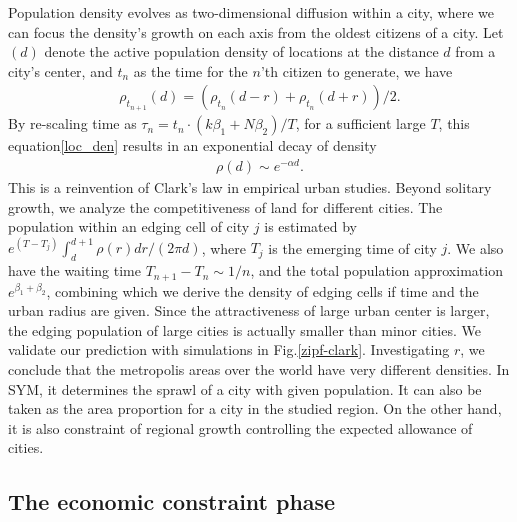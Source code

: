 \documentclass[reprint,unsortedaddress,amsmath,amssymb,aps,prl,showkeys]{revtex4-2}
\begin{document}

Population density evolves as two-dimensional diffusion within a city\cite{doi:10.1137/0150099}, where we can focus the density's growth on each axis from the oldest citizens of a city. Let $
(d)$ denote the active population density of locations at the distance $d$ from a city's center, and $t_n$ as the time for the $n$'th citizen to generate, we have 
\begin{align}
	\rho_{t_{n+1}}(d) = (\rho_{t_{n}}(d-r) + \rho_{t_{n}}(d+r) )/2.\label{loc_den}  
\end{align} By re-scaling time as $\tau_n = t_n\cdot (k\beta_1+N\beta_2)/T$, for a sufficient large $T$, this equation\@\ref{loc_den} results in an exponential decay of density
\begin{align}
	\rho(d)\sim e^{-\alpha d}\label{clark_eq}.
\end{align}
This is a reinvention of Clark's law in empirical urban studies\cite{clark1951urban}. Beyond solitary growth, we analyze the competitiveness of land for different cities. The population within an edging cell of city $j$ is estimated by $e^{(T-T_j)}\int_{d}^{d+1}\rho(r)dr/(2\pi d)$, where $T_j$ is the emerging time of city $j$. We also have the waiting time $T_{n+1}-T_{n}\sim 1/n$, and the total population approximation $e^{\beta_1+\beta_2}$, combining which we derive the density of edging cells if time and the urban radius are given. Since the attractiveness of large urban center is larger, the edging population of large cities is actually smaller than minor cities. We validate our prediction with simulations in Fig.\@\ref{zipf-clark}. %
Investigating $r$, we conclude that the metropolis areas over the world have very different densities. In SYM, it determines the sprawl of a city with given population. It can also be taken as the area proportion for a city in the studied region. On the other hand, it is also constraint of regional growth controlling the expected allowance of cities. 

\subsection{The economic constraint phase}
\end{document}
